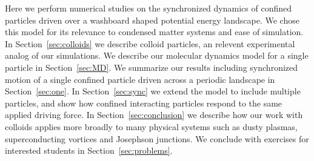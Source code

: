 \documentclass[twocolumn,preprintnumbers,amsmath,amssymb,aps,prx]{revtex4}
\begin{document}
Here we perform numerical studies 
on the synchronized dynamics
of confined particles driven over
a washboard shaped potential energy landscape.
We chose this model for its
relevance to condensed matter systems
and ease of simulation.
In Section~\ref{sec:colloids} we describe colloid particles,
an relevent
experimental analog of our simulations.
We describe
our molecular dynamics model for a single particle in Section~\ref{sec:MD}.
We summarize
our results 
including synchronized motion of a single confined particle
driven across a periodic landscape in 
Section~\ref{sec:one}.
In Section~\ref{sec:sync}
we 
extend the model to include multiple particles,
and show how confined 
interacting particles respond to the same applied driving force.
In Section~\ref{sec:conclusion}
we describe how our work with colloids applies more broadly
to many physical systems
such as dusty plasmas, superconducting vortices and Josephson junctions.
We conclude with
exercises for interested students 
in Section~\ref{sec:problems}.
\end{document}
